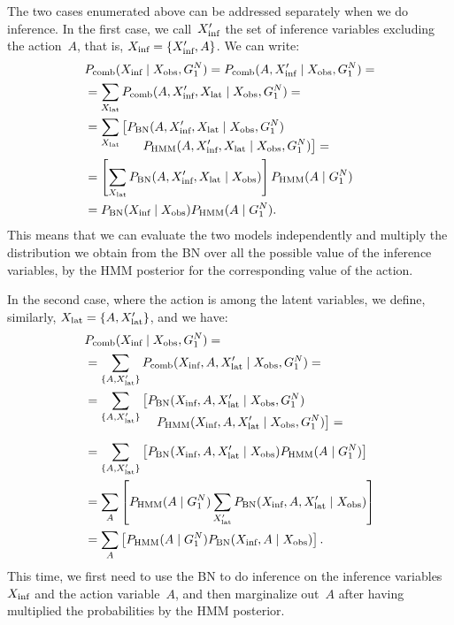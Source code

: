 The two cases enumerated above can be addressed separately when we do inference.
In the first case, we call~$X_\text{inf}^\prime$ the set of inference variables excluding the action~$A$, that is, $X_\text{inf} = \{X_\text{inf}^\prime, A\}$.
We can write:
\begin{align*}
  & P_\text{comb}(X_\text{inf} \mid  X_\text{obs}, G_1^N) = P_\text{comb}(A, X_\text{inf}^\prime \mid  X_\text{obs}, G_1^N)= \\
  &= \sum_{X_\text{lat}} P_\text{comb}(A, X_\text{inf}^\prime, X_\text{lat} \mid X_\text{obs}, G_1^N)=\\
  &= \sum_{X_\text{lat}} \left[P_{\text{BN}}(A, X_\text{inf}^\prime, X_\text{lat} \mid X_\text{obs}, G_1^N)\right. \\[-4mm]
    & \mspace{80mu} \left.P_{\text{HMM}}(A, X_\text{inf}^\prime, X_\text{lat} \mid X_\text{obs}, G_1^N)\right]= \\
  &= \left[\sum_{X_\text{lat}} P_{\text{BN}}(A, X_\text{inf}^\prime, X_\text{lat} \mid X_\text{obs})\right] P_{\text{HMM}}(A \mid G_1^N) \\
  &= P_{\text{BN}}(X_\text{inf} \mid X_\text{obs}) P_{\text{HMM}}(A \mid G_1^N).
\end{align*}
This means that we can evaluate the two models independently and multiply the distribution we obtain from the \ac{BN} over all the possible value of the inference variables, by the \ac{HMM} posterior for the corresponding value of the action.

In the second case, where the action is among the latent variables, we define, similarly, $X_\text{lat} = \{A, X_\text{lat}^\prime\}$, and we have:
\begin{align*}
  & \pcomb(\xinf \given \xobs, G_1^N) = \\
  &= \sum_{\{A,\xlat^\prime\}} \pcomb(\xinf, A, \xlat^\prime \given \xobs, G_1^N)=\\
  &= \sum_{\{A,\xlat^\prime\}} \left[\pbn(\xinf, A, \xlat^\prime \given \xobs, G_1^N)\right. \\[-4mm]
    & \mspace{100mu} \left.\phmm(\xinf, A, \xlat^\prime \given \xobs, G_1^N)\right]= \\[2mm]
  &= \sum_{\{A,\xlat^\prime\}} \left[\pbn(\xinf, A, \xlat^\prime \given \xobs) \phmm(A \given G_1^N)\right] \\
  &= \sum_{A}\left[\phmm(A \given G_1^N)\sum_{\xlat^\prime} \pbn(\xinf, A, \xlat^\prime \given \xobs)\right] \\
  &= \sum_{A}\left[\phmm(A \given G_1^N) \pbn(\xinf, A \given \xobs)\right]. \\
\end{align*}
This time, we first need to use the \ac{BN} to do inference on the inference variables~$X_\text{inf}$ and the action variable~$A$, and then marginalize out~$A$ after having multiplied the probabilities by the \ac{HMM} posterior.

